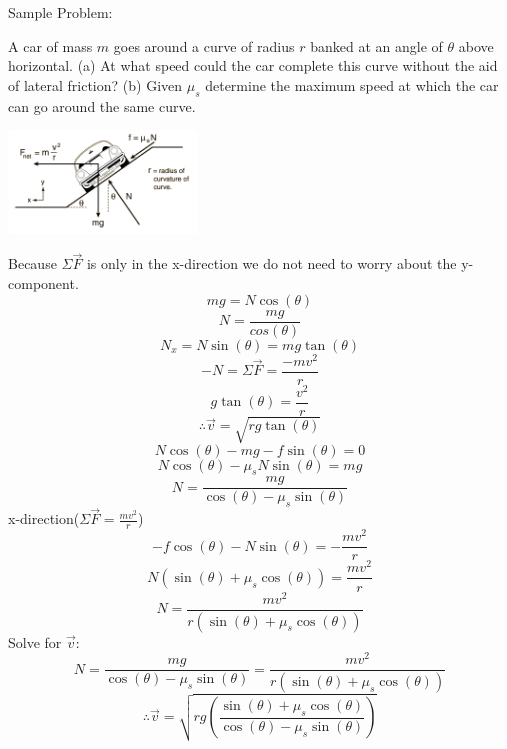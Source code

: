 \documentclass{article}
\begin{document}
        \noindent{\centerline{\rule{5cm}{0.4pt}}}
		Sample Problem:
        \begin{multicols}{2}
            A car of mass $m$ goes around a curve of radius $r$ banked at an angle of $\theta$ above horizontal.  (a) At what speed could the car complete this curve without the aid of lateral friction?  (b) Given $\mu_s$ determine the maximum speed at which the car can go around the same curve.
            \centerline{\includegraphics[width=5cm]{bankedCurve.png}}
            Because $\Sigma\vec{F}$ is only in the x-direction we do not need to worry about the y-component.
            \[
            	mg=N\cos(\theta)
            \]
            \[
            	N=\frac{mg}{cos(\theta)}
            \]
            \[
            	N_x=N\sin(\theta)=mg\tan(\theta)
            \]
            \[
            	-N=\Sigma\vec{F}=\frac{-mv^2}{r}
            \]
            \[
            	g\tan(\theta)=\frac{v^2}{r}
            \]
            \[
            	\therefore \vec{v}=\sqrt{rg\tan(\theta)}
            \]
            \vfill
		\columnbreak
            \[
            	N\cos(\theta)-mg-f\sin(\theta)=0
            \]
            \[
            	N\cos(\theta)-\mu_sN\sin(\theta)=mg
            \]
            \[
            	N=\frac{mg}{\cos(\theta)-\mu_s\sin(\theta)}
            \]
            x-direction($\Sigma\vec{F}=\frac{mv^2}{r}$)
            \[
            	-f\cos(\theta)-N\sin(\theta)=-\frac{mv^2}{r}
			\]
            \[
            	N(\sin(\theta)+\mu_s\cos(\theta))=\frac{mv^2}{r}
            \]
            \[
            	N=\frac{mv^2}{r(\sin(\theta)+\mu_s\cos(\theta))}
            \]
            Solve for $\vec{v}$:
            \[
            	N=\frac{mg}{\cos(\theta)-\mu_s\sin(\theta)}=\frac{mv^2}{r(\sin(\theta)+\mu_s\cos(\theta))}
            \]
            \[
            	\therefore \vec{v}=\sqrt{rg(\frac{\sin(\theta)+\mu_s\cos(\theta)}{\cos(\theta)-\mu_s\sin(\theta)})}
            \]
        \end{multicols}
        
\end{document}
